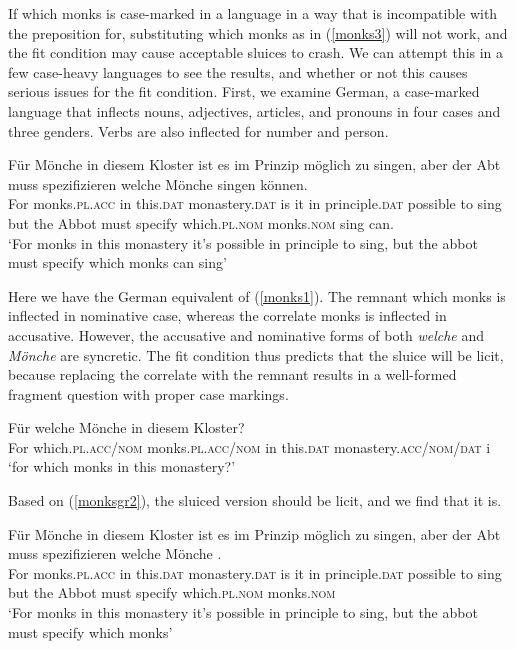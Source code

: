 \documentclass{turabian-researchpaper}
\begin{document}
If which monks is case-marked in a language in a way that is incompatible with the preposition for, substituting which monks as in (\ref{monks3}) will not work, and the fit condition may cause acceptable sluices to crash. We can attempt this in a few case-heavy languages to see the results, and whether or not this causes serious issues for the fit condition. First, we examine German, a case-marked language that inflects nouns, adjectives, articles, and pronouns in four cases and three genders. Verbs are also inflected for number and person. 

\begin{exe}
\ex\label{monksgr1}
\gll F\"ur M\"onche in diesem Kloster ist es im Prinzip m\"oglich  zu singen, aber der Abt muss spezifizieren welche M\"onche singen k\"onnen. \\
For monks.\textsc{pl.acc} in this.\textsc{dat} monastery.\textsc{dat} is it in principle.\textsc{dat} possible to  sing but the Abbot must  specify which.\textsc{pl.nom} monks.\textsc{nom} sing can. \\
\trans `For monks in this monastery it's possible in principle to sing, but the abbot must specify 
which monks can sing'
\end{exe}

Here we have the German equivalent of (\ref{monks1}). The remnant which monks is inflected in nominative case, whereas the correlate monks is inflected in accusative. However, the accusative and nominative forms of both \textit{welche} and \textit{M\"onche} are syncretic. The fit condition thus predicts that the sluice will be licit, because replacing the correlate with the remnant results in a well-formed fragment question with proper case markings. 

\begin{exe}
\ex\label{monksgr2}
\gll F\"ur welche M\"onche in diesem Kloster? \\
For which.\textsc{pl.acc/nom} monks.\textsc{pl.acc/nom} in this.\textsc{dat} monastery.\textsc{acc/nom/dat} i\\
\trans `for which monks in this monastery?'
\end{exe}

Based on (\ref{monksgr2}), the sluiced version should be licit, and we find that it is. 

\begin{exe}
\ex\label{monksgr3}
\gll F\"ur M\"onche in diesem Kloster ist es im Prinzip m\"oglich  zu singen, aber der Abt muss spezifizieren welche M\"onche . \\
For monks.\textsc{pl.acc} in this.\textsc{dat} monastery.\textsc{dat} is it in principle.\textsc{dat} possible to  sing but the Abbot must  specify which.\textsc{pl.nom} monks.\textsc{nom} \\
\trans `For monks in this monastery it's possible in principle to sing, but the abbot must specify 
which monks'
\end{exe}
\end{document}
